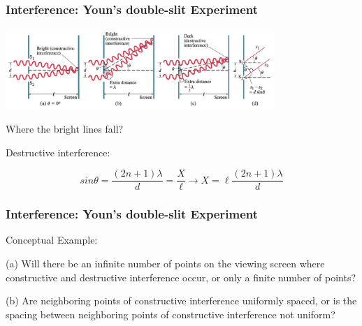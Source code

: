 \documentclass[]{beamer}
\begin{document}


\begin{frame}

\frametitle{Interference: Youn's double-slit Experiment}

  \begin{center}
  \includegraphics[height=1.2in]{images5/doubleslit2.jpg}
\end{center}


Where the bright lines fall?

\vspace{3mm}



Destructive interference:

\vspace{3mm}

\begin{equation}
 sin\theta=\frac{(2n+1)\lambda}{d}=\frac{X}{\ell}\rightarrow X=\ell \frac{(2n+1)\lambda}{d}
\end{equation}

  \end{frame}





\begin{frame}

\frametitle{Interference: Youn's double-slit Experiment}

Conceptual Example:
\vspace{3mm}

(a) Will there be an infinite number of points on the viewing screen where constructive and destructive
interference occur, or only a finite number of points? 
\vspace{3mm}
\pause

(b) Are neighboring points
of constructive interference uniformly spaced, or is the spacing between neighboring
points of constructive interference not uniform?

  \end{frame}


\end{document}
